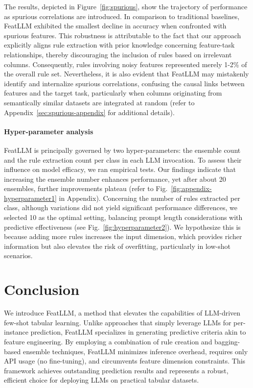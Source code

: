 The results, depicted in Figure~\ref{fig:spurious}, show the trajectory of performance as spurious correlations are introduced. In comparison to traditional baselines, \textsf{FeatLLM} exhibited the smallest decline in accuracy when confronted with spurious features. This robustness is attributable to the fact that our approach explicitly aligns rule extraction with prior knowledge concerning feature-task relationships, thereby discouraging the inclusion of rules based on irrelevant columns. Consequently, rules involving noisy features represented merely 1-2\% of the overall rule set. Nevertheless, it is also evident that \textsf{FeatLLM} may mistakenly identify and internalize spurious correlations, confusing the causal links between features and the target task, particularly when columns originating from semantically similar datasets are integrated at random (refer to Appendix~\ref{sec:spurious-appendix} for additional details).

\vspace*{-0.12in}
\paragraph{Hyper-parameter analysis}
\textsf{FeatLLM} is principally governed by two hyper-parameters: the ensemble count and the rule extraction count per class in each LLM invocation. To assess their influence on model efficacy, we ran empirical tests. Our findings indicate that increasing the ensemble number enhances performance, yet after about 20 ensembles, further improvements plateau (refer to Fig.~\ref{fig:appendix-hyperparameter1} in Appendix). Concerning the number of rules extracted per class, although variations did not yield significant performance differences, we selected 10 as the optimal setting, balancing prompt length considerations with predictive effectiveness (see Fig.~\ref{fig:hyperparameter2}). We hypothesize this is because adding more rules increases the input dimension, which provides richer information but also elevates the risk of overfitting, particularly in low-shot scenarios.

\section{Conclusion}
We introduce \textsf{FeatLLM}, a method that elevates the capabilities of LLM-driven few-shot tabular learning. Unlike approaches that simply leverage LLMs for per-instance prediction, \textsf{FeatLLM} specializes in generating predictive criteria akin to feature engineering. By employing a combination of rule creation and bagging-based ensemble techniques, \textsf{FeatLLM} minimizes inference overhead, requires only API usage (no fine-tuning), and circumvents feature dimension constraints. This framework achieves outstanding prediction results and represents a robust, efficient choice for deploying LLMs on practical tabular datasets.


